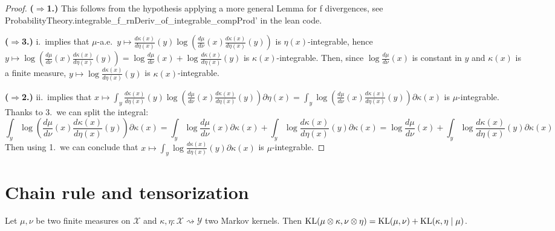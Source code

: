 \begin{proof}
{\bfseries($\Rightarrow$1.)} This follows from the hypothesis applying a more general Lemma for f divergences, see ProbabilityTheory.integrable\_f\_rnDeriv\_of\_integrable\_compProd' in the lean code.

{\bfseries($\Rightarrow$3.)} i.\ implies that $\mu$-a.e.\ $y \mapsto \frac{d \kappa(x)}{d \eta(x)}(y) \log \left(\frac{d \mu}{d \nu}(x) \frac{d \kappa(x)}{d \eta(x)}(y) \right)$ is $\eta(x)$-integrable, hence $y \mapsto \log \left(\frac{d \mu}{d \nu}(x) \frac{d \kappa(x)}{d \eta(x)}(y) \right) = \log \frac{d \mu}{d \nu}(x) + \log \frac{d \kappa(x)}{d \eta(x)}(y)$ is $\kappa(x)$-integrable. Then, since $\log \frac{d \mu}{d \nu}(x)$ is constant in $y$ and $\kappa(x)$ is a finite measure, $y \mapsto \log \frac{d \kappa(x)}{d \eta(x)}(y)$ is $\kappa(x)$-integrable.

{\bfseries($\Rightarrow$2.)} ii.\ implies that $x \mapsto  \int_y \frac{d \kappa(x)}{d \eta(x)}(y) \log \left(\frac{d \mu}{d \nu}(x) \frac{d \kappa(x)}{d \eta(x)}(y) \right) \partial \eta (x) = \int_y \log \left(\frac{d \mu}{d \nu}(x) \frac{d \kappa(x)}{d \eta(x)}(y) \right) \partial \kappa (x)$ is $\mu$-integrable. 
Thanks to 3.\ we can split the integral:
$$\int_y \log \left(\frac{d \mu}{d \nu}(x) \frac{d \kappa(x)}{d \eta(x)}(y) \right) \partial \kappa (x)
= \int_y \log \frac{d \mu}{d \nu}(x) \partial \kappa (x) + \int_y \log \frac{d \kappa(x)}{d \eta(x)}(y) \partial \kappa (x) = \log \frac{d \mu}{d \nu}(x) + \int_y \log \frac{d \kappa(x)}{d \eta(x)}(y) \partial \kappa (x)$$
Then using 1.\ we can conclude that $x \mapsto \int_y \log \frac{d \kappa(x)}{d \eta(x)}(y) \partial \kappa (x)$ is $\mu$-integrable.

\end{proof}



\section{Chain rule and tensorization}

\begin{theorem}
  \label{thm:kl_chain_rule}
  \leanok
  Let $\mu, \nu$ be two finite measures on $\mathcal X$ and $\kappa, \eta : \mathcal X \rightsquigarrow \mathcal Y$ two Markov kernels.
  Then $\operatorname{KL}(\mu \otimes \kappa, \nu \otimes \eta) = \operatorname{KL}(\mu, \nu) + \operatorname{KL}(\kappa, \eta \mid \mu)$.
\end{theorem}


